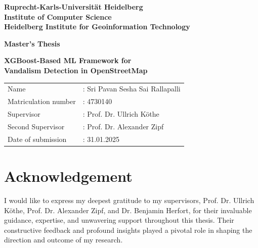 \documentclass[
    13pt, %
    a4paper, %
    listof=totoc, %
    bibliography=totoc, %
    index=totoc, %
    headsepline
]{scrreprt}
\begin{document}
\begin{titlepage}

\begin{center}


\vspace*{2cm} %
\textbf{ 
\LARGE Ruprecht-Karls-Universität Heidelberg\\
\vspace*{0.5cm}
\smallskip
\Large Institute of Computer Science\\
\smallskip
\Large Heidelberg Institute for Geoinformation Technology\\
}

\vspace{2cm} %
\textbf{\large Master's Thesis} %

\textbf{\LARGE
XGBoost-Based ML Framework for \\
\vspace{0.3cm}
Vandalism Detection in OpenStreetMap
}

\vspace{2cm} %
{\large
\begin{tabular}{ll}
Name &:     Sri Pavan Sesha Sai Rallapalli\\
Matriculation number&: 4730140\\
Supervisor&:  Prof. Dr. Ullrich Köthe\\
Second Supervisor&: Prof. Dr. Alexander Zipf\\
Date of submission&:  31.01.2025
\end{tabular}
}

\end{center}

\end{titlepage}




\newpage
\thispagestyle{empty}
\null
\addtocounter{page}{-1}
\clearpage

\newpage
\section*{\LARGE Acknowledgement}
\thispagestyle{plain}

I would like to express my deepest gratitude to my supervisors, Prof. Dr. Ullrich Köthe, Prof. Dr. Alexander Zipf, and Dr. Benjamin Herfort, for their invaluable guidance, expertise, and unwavering support throughout this thesis. Their constructive feedback and profound insights played a pivotal role in shaping the direction and outcome of my research.
\end{document}
